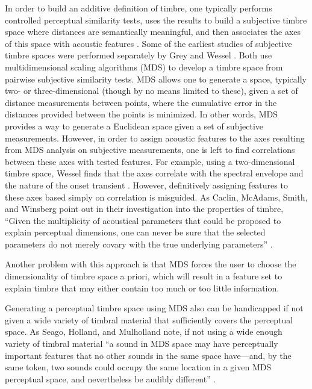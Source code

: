 \documentclass[12pt]{report} 	%
\numberwithin{figure}{chapter}
\numberwithin{table}{chapter}
\numberwithin{equation}{chapter}
\begin{document}
\begin{flushleft}
In order to build an additive definition of timbre, one typically performs controlled perceptual similarity tests, uses the results to build a subjective timbre space where distances are semantically meaningful, and then associates the axes of this space with acoustic features \cite[p. 1]{Pampalk:2008xz}. Some of the earliest studies of subjective timbre spaces were performed separately by Grey and Wessel \cite{Grey:NoRead, Wessel:1979tg}. Both use multidimensional scaling algorithms (MDS) to develop a timbre space from pairwise subjective similarity tests. MDS allows one to generate a space, typically two- or three-dimensional (though by no means limited to these), given a set of distance measurements between points, where the cumulative error in the distances provided between the points is minimized. In other words, MDS provides a way to generate a Euclidean space given a set of subjective measurements. However, in order to assign acoustic features to the axes resulting from MDS analysis on subjective measurements, one is left to find correlations between these axes with tested features. For example, using a two-dimensional timbre space, Wessel finds that the axes correlate with the spectral envelope and the nature of the onset transient \cite[p. 48]{Wessel:1979tg}. However, definitively assigning features to these axes based simply on correlation is misguided. As Caclin, McAdams, Smith, and Winsberg point out in their investigation into the properties of timbre, ``Given the multiplicity of acoustical parameters that could be proposed to explain perceptual dimensions, one can never be sure that the selected parameters do not merely covary with the true underlying parameters'' \cite[p. 2]{Caclin:2005il}. 

Another problem with this approach is that MDS forces the user to choose the dimensionality of timbre space a priori, which will result in a feature set to explain timbre that may either contain too much or too little information.

Generating a perceptual timbre space using MDS also can be handicapped if not given a wide variety of timbral material that sufficiently covers the perceptual space. As Seago, Holland, and Mulholland note, if not using a wide enough variety of timbral material ``a sound in MDS space may have perceptually important features that no other sounds in the same space have---and, by the same token, two sounds could occupy the same location in a given MDS perceptual space, and nevertheless be audibly different'' \cite[p. 3]{Seago:2008ya}.


\end{flushleft}
\end{document}
